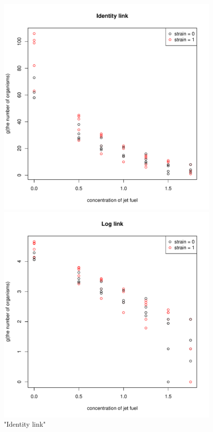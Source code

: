 \documentclass[]{article}
\begin{document}
\begin{enumerate}
{\begin{figure}
	\centering
		\includegraphics[width = \textwidth]{pic/HW2_4/Identity_link}
		\caption{"Identity link"}
		\label{Ide}
	\endminipage\hfill
		\includegraphics[width = \textwidth]{pic/HW2_4/Log_link}

\end{figure}}
\end{enumerate}
\end{document}
